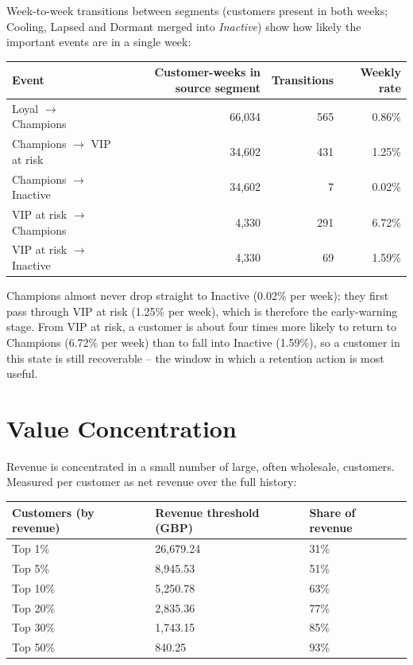 Week-to-week transitions between segments (customers present in both weeks; Cooling, Lapsed and Dormant merged into \emph{Inactive}) show how likely the important events are in a single week:

\begin{center}
\small
\begin{tabular}{@{}p{5.6cm}rrr@{}}
    \toprule
    Event & Customer-weeks in source segment & Transitions & Weekly rate \\
    \midrule
    Loyal $\to$ Champions & 66,034 & 565 & 0.86\% \\
    Champions $\to$ VIP at risk & 34,602 & 431 & 1.25\% \\
    Champions $\to$ Inactive & 34,602 & 7 & 0.02\% \\
    VIP at risk $\to$ Champions & 4,330 & 291 & 6.72\% \\
    VIP at risk $\to$ Inactive & 4,330 & 69 & 1.59\% \\
    \bottomrule
\end{tabular}
\end{center}

Champions almost never drop straight to Inactive (0.02\% per week); they first pass through VIP at risk (1.25\% per week), which is therefore the early-warning stage. From VIP at risk, a customer is about four times more likely to return to Champions (6.72\% per week) than to fall into Inactive (1.59\%), so a customer in this state is still recoverable -- the window in which a retention action is most useful.

\section{Value Concentration}
\label{sec:4-7}

Revenue is concentrated in a small number of large, often wholesale, customers. Measured per customer as net revenue over the full history:

\begin{center}
\begin{tabular}{@{}p{3.6cm}p{4.2cm}p{3.2cm}@{}}
    \toprule
    Customers (by revenue) & Revenue threshold (GBP) & Share of revenue \\
    \midrule
    Top 1\% & 26,679.24 & 31\% \\
    Top 5\% & 8,945.53 & 51\% \\
    Top 10\% & 5,250.78 & 63\% \\
    Top 20\% & 2,835.36 & 77\% \\
    Top 30\% & 1,743.15 & 85\% \\
    Top 50\% & 840.25 & 93\% \\
    \bottomrule
\end{tabular}
\end{center}

